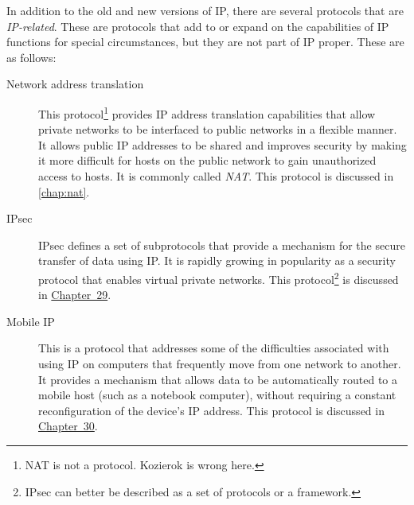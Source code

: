 In addition to the old and new versions of IP, there are several protocols that are {\emph{IP-related}}.
These are protocols that add to or expand on the capabilities of IP functions for special circumstances, but they are not part of IP proper.
These are as follows:
\begin{description}
   \item[Network address translation]
      This protocol\footnote{NAT is not a protocol. Kozierok is wrong here.} provides IP address translation capabilities that allow private networks to be interfaced to public networks in a flexible manner.
      It allows public IP addresses to be shared and improves security by making it more difficult for hosts on the public network to gain unauthorized access to hosts.
      It is commonly called {\emph{NAT}}.
      This protocol is discussed in \vref{chap:nat}.

   \item[IPsec]
      IPsec defines a set of subprotocols that provide a mechanism for the secure transfer of data using IP.
      It is rapidly growing in popularity as a security protocol that enables virtual private networks.
      This protocol\footnote{IPsec can better be described as a set of protocols or a framework.} is discussed in \protect\hyperlink{ch29.html}{Chapter~29}.

   \item[Mobile IP]
      This is a protocol that addresses some of the difficulties associated with using IP on computers that frequently move from one network to another.
      It provides a mechanism that allows data to be automatically routed to a mobile host (such as a notebook computer), without requiring a constant reconfiguration of the device's IP address.
      This protocol is discussed in \protect\hyperlink{ch30.html}{Chapter~30}.
\end{description}
